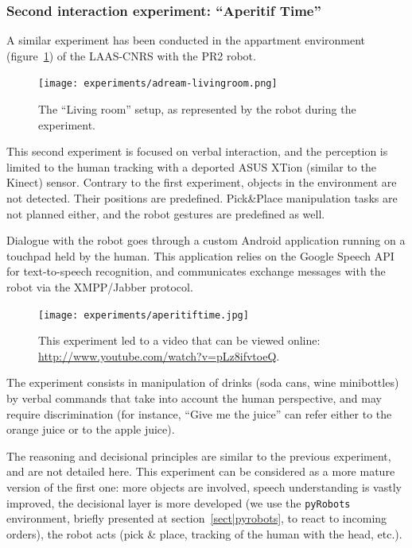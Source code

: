 \subsubsection{Second interaction experiment: ``Aperitif Time''}
\label{sect|expe2}

A similar experiment has been conducted in the appartment environment
(figure~\ref{fig|livingroom}) of the LAAS-CNRS with the PR2 robot.

\begin{figure}
    \centering
    \texttt{[image: experiments/adream-livingroom.png]}

    \caption{The ``Living room'' setup, as represented by the robot during the
    experiment.}

    \label{fig|livingroom}
\end{figure}

This second experiment is focused on verbal interaction, and the perception is
limited to the human tracking with a deported ASUS XTion (similar to the
Kinect) sensor. Contrary to the first experiment, objects in the environment
are not detected. Their positions are predefined. Pick\&Place manipulation
tasks are not planned either, and the robot gestures are predefined as well.

Dialogue with the robot goes through a custom Android application running on a
touchpad held by the human. This application relies on the Google Speech API
for text-to-speech recognition, and communicates exchange messages with the
robot via the XMPP/Jabber protocol.


\begin{figure}
    \centering
    \texttt{[image: experiments/aperitiftime.jpg]}
    \caption{This experiment led to a video that can be viewed online:
\url{http://www.youtube.com/watch?v=pLz8ifvtoeQ}.}
    \label{fig|aperitif-video}
\end{figure}

The experiment consists in manipulation of drinks (soda cans, wine minibottles)
by verbal commands that take into account the human perspective, and may
require discrimination (for instance, ``Give me the juice'' can refer either to
the orange juice or to the apple juice).

The reasoning and decisional principles are similar to the previous experiment,
and are not detailed here. This experiment can be considered as a more mature
version of the first one: more objects are involved, speech understanding is
vastly improved, the decisional layer is more developed (we use the {\tt pyRobots}
environment, briefly presented at section~\ref{sect|pyrobots}, to react
to incoming orders), the robot acts (pick \& place, tracking of the human with
the head, etc.).

